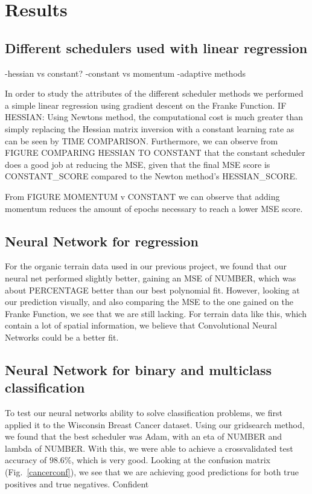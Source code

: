 \documentclass[onecolumn,10pt,cleanfoot]{asme2ej}
\begin{document}
\section{Results}

\subsection{Different schedulers used with linear regression}

-hessian vs constant?
-constant vs momentum
-adaptive methods

In order to study the attributes of the different scheduler methods we performed a simple linear regression using gradient descent on the Franke Function. IF HESSIAN: Using Newtons method, the computational cost is much greater than simply replacing the Hessian matrix inversion with a constant learning rate as can be seen by TIME COMPARISON. Furthermore, we can observe from FIGURE COMPARING HESSIAN TO CONSTANT that the constant scheduler does a good job at reducing the MSE, given that the final MSE score is CONSTANT_SCORE compared to the Newton method's HESSIAN_SCORE.

From FIGURE MOMENTUM v CONSTANT we can observe that adding momentum reduces the amount of epochs necessary to reach a lower MSE score. 

\subsection{Neural Network for regression}

For the organic terrain data used in our previous project, we found that our neural net performed slightly better, gaining an MSE of NUMBER, which was about PERCENTAGE better than our best polynomial fit. However, looking at our prediction visually, and also comparing the MSE to the one gained on the Franke Function, we see that we are still lacking. For terrain data like this, which contain a lot of spatial information, we believe that Convolutional Neural Networks could be a better fit.

\subsection{Neural Network for binary and multiclass classification}

To test our neural networks ability to solve classification problems, we first applied it to the Wisconsin Breast Cancer dataset. Using our gridsearch method, we found that the best scheduler was Adam, with an eta of NUMBER and lambda of NUMBER. With this, we were able to achieve a crossvalidated test accuracy of $98.6 \%$, which is very good. Looking at the confusion matrix (Fig.~\ref{cancerconf}), we see that we are achieving good predictions for both true positives and true negatives. Confident 
\end{document}
